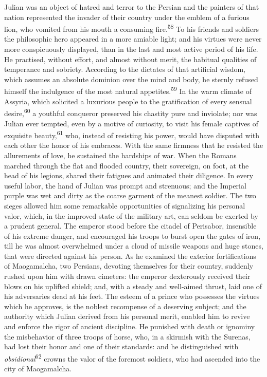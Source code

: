 Julian was an object of hatred and terror to the Persian and the
painters of that nation represented the invader of their country
under the emblem of a furious lion, who vomited from his mouth a
consuming fire.\textsuperscript{58} To his friends and soldiers the philosophic
hero appeared in a more amiable light; and his virtues were never
more conspicuously displayed, than in the last and most active
period of his life. He practised, without effort, and almost
without merit, the habitual qualities of temperance and sobriety.
According to the dictates of that artificial wisdom, which
assumes an absolute dominion over the mind and body, he sternly
refused himself the indulgence of the most natural appetites.\textsuperscript{59}
In the warm climate of Assyria, which solicited a luxurious
people to the gratification of every sensual desire,\textsuperscript{60} a
youthful conqueror preserved his chastity pure and inviolate; nor
was Julian ever tempted, even by a motive of curiosity, to visit
his female captives of exquisite beauty,\textsuperscript{61} who, instead of
resisting his power, would have disputed with each other the
honor of his embraces. With the same firmness that he resisted
the allurements of love, he sustained the hardships of war. When
the Romans marched through the flat and flooded country, their
sovereign, on foot, at the head of his legions, shared their
fatigues and animated their diligence. In every useful labor, the
hand of Julian was prompt and strenuous; and the Imperial purple
was wet and dirty as the coarse garment of the meanest soldier.
The two sieges allowed him some remarkable opportunities of
signalizing his personal valor, which, in the improved state of
the military art, can seldom be exerted by a prudent general. The
emperor stood before the citadel of Perisabor, insensible of his
extreme danger, and encouraged his troops to burst open the gates
of iron, till he was almost overwhelmed under a cloud of missile
weapons and huge stones, that were directed against his person.
As he examined the exterior fortifications of Maogamalcha, two
Persians, devoting themselves for their country, suddenly rushed
upon him with drawn cimeters: the emperor dexterously received
their blows on his uplifted shield; and, with a steady and
well-aimed thrust, laid one of his adversaries dead at his feet.
The esteem of a prince who possesses the virtues which he
approves, is the noblest recompense of a deserving subject; and
the authority which Julian derived from his personal merit,
enabled him to revive and enforce the rigor of ancient
discipline. He punished with death or ignominy the misbehavior of
three troops of horse, who, in a skirmish with the Surenas, had
lost their honor and one of their standards: and he distinguished
with \textit{obsidional}\textsuperscript{62} crowns the valor of the foremost soldiers,
who had ascended into the city of Maogamalcha.

